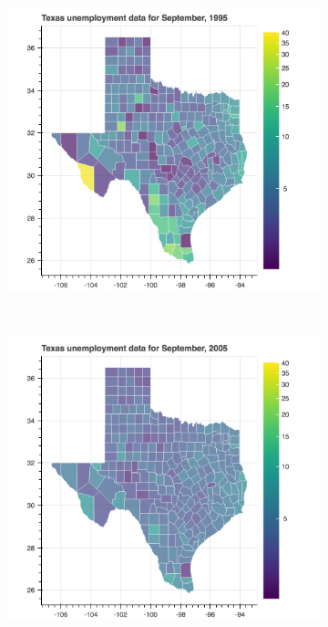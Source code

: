 \documentclass[11pt,letterpaper]{article}
\begin{document}
\begin{figure}
\centering
\begin{subfigure}{0.3\textwidth}
\includegraphics[width=1.2\linewidth]{tx_unemp_1995}
\end{subfigure}
~
\begin{subfigure}{0.3\textwidth}
\includegraphics[width=1.2\linewidth]{tx_unemp_2005}
\end{subfigure}

\end{figure}
\end{document}
